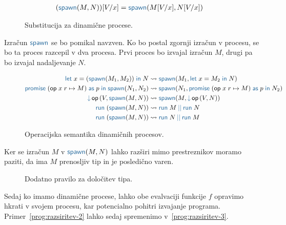 \begin{figure}[H]
	\centering
	\small
	\begin{align*}
		(\tmspawn{M}{N})[V/x] &= \tmspawn{M[V/x]}{N[V/x]}
	\end{align*}
	\caption{Substitucija za dinamične procese.}
	\label{fig:substitucija-spawn}
\end{figure}

Izračun $\tmkw{spawn}$ se bo pomikal navzven. Ko bo postal zgornji izračun v procesu, se bo ta proces razcepil v dva procesa. 
Prvi proces bo izvajal izračun $M$, drugi pa bo izvajal nadaljevanje $N$.

\begin{figure}[H]
	\centering
	\small
	\begin{align*}
	\tmlet{x}{(\tmspawn{M_1}{M_2})}{N} & \reduces \tmspawn{M_1}{\tmlet{x}{M_2}{N}}
	\\
	\tmwithrec{op}{x}{r}{M}{p}{\tmspawn{N_1}{N_2}} & \reduces \tmspawn{N_1}{\tmwithrec{op}{x}{r}{M}{p}{N_2}}
	\\
	\tmopin{op}{V}{\tmspawn{M}{N}} & \reduces \tmspawn{M}{\tmopin{op}{V}{N}}
	\\
	\tmrun{(\tmspawn{M}{N})} & \reduces \tmpar{\tmrun{M}}{\tmrun{N}}
	\\
	\tmrun{(\tmspawn{M}{N})} & \reduces \tmpar{\tmrun{N}}{\tmrun{M}}
	\end{align*}
	
	\caption{Operacijska semantika dinamičnih procesov.}
	\label{fig:semantika-spawn}
\end{figure}


Ker se izračun $M$ v $\tmspawn{M}{N}$ lahko razširi mimo prestreznikov moramo paziti, da ima $M$ prenosljiv tip in je posledično varen.   

\begin{figure}[H]
	\centering
	\small
	\begin{mathpar}
	\end{mathpar}
	\vspace{-5ex}
	\caption{Dodatno pravilo za določitev tipa.}
	\label{fig:tipi-pravila-spawn}
\end{figure}


Sedaj ko imamo dinamične procese, lahko obe evalvaciji funkcije $f$ opravimo hkrati v svojem procesu, kar potencialno pohitri izvajanje programa. Primer~\ref{prog:razsiritev-2} lahko sedaj spremenimo v~\ref{prog:razsiritev-3}. 

